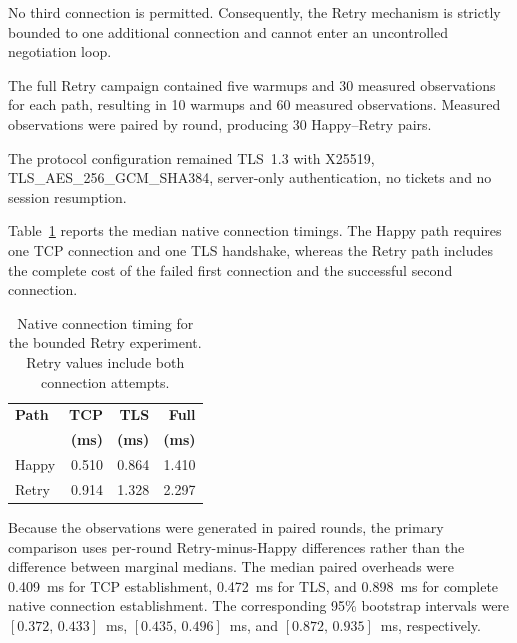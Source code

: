 \documentclass[journal]{IEEEtran}
\begin{document}
No third connection is permitted. Consequently, the Retry mechanism is
strictly bounded to one additional connection and cannot enter an
uncontrolled negotiation loop.



The full Retry campaign contained five warmups and 30 measured observations
for each path, resulting in 10 warmups and 60 measured observations.
Measured observations were paired by round, producing 30 Happy--Retry pairs.

The protocol configuration remained TLS~1.3 with X25519,
TLS\_AES\_256\_GCM\_SHA384, server-only authentication, no tickets and no
session resumption.



Table~\ref{tab:retry-performance} reports the median native connection
timings. The Happy path requires one TCP connection and one TLS handshake,
whereas the Retry path includes the complete cost of the failed first
connection and the successful second connection.



\begin{table}[t]

\caption{Native connection timing for the bounded Retry experiment. Retry values include both connection attempts.}

\label{tab:retry-performance}

\centering

\begin{tabular}{lrrr}

\toprule

\textbf{Path} &

\textbf{TCP} &

\textbf{TLS} &

\textbf{Full} \\

& \textbf{(ms)} & \textbf{(ms)} & \textbf{(ms)} \\

\midrule

Happy & 0.510 & 0.864 & 1.410 \\

Retry & 0.914 & 1.328 & 2.297 \\

\bottomrule

\end{tabular}

\end{table}



Because the observations were generated in paired rounds, the primary
comparison uses per-round Retry-minus-Happy differences rather than the
difference between marginal medians. The median paired overheads were
0.409~ms for TCP establishment, 0.472~ms for TLS, and 0.898~ms for complete
native connection establishment. The corresponding 95\% bootstrap intervals
were $[0.372,\,0.433]$~ms, $[0.435,\,0.496]$~ms, and
$[0.872,\,0.935]$~ms, respectively.
\end{document}
